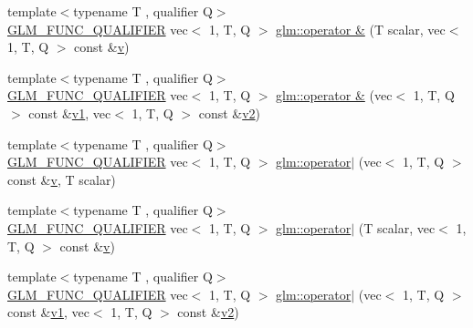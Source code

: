 \begin{DoxyCompactItemize}
\item 
{\footnotesize template$<$typename T , qualifier Q$>$ }\\\hyperlink{setup_8hpp_a33fdea6f91c5f834105f7415e2a64407}{G\+L\+M\+\_\+\+F\+U\+N\+C\+\_\+\+Q\+U\+A\+L\+I\+F\+I\+ER} vec$<$ 1, T, Q $>$ \hyperlink{group__ext__vec1_ga6637b42fbf149b977ce3f66571be212a}{glm\+::operator \&} (T scalar, vec$<$ 1, T, Q $>$ const \&\hyperlink{_s_d_l__opengl_8h_a10a82eabcb59d2fcd74acee063775f90}{v})
\item 
{\footnotesize template$<$typename T , qualifier Q$>$ }\\\hyperlink{setup_8hpp_a33fdea6f91c5f834105f7415e2a64407}{G\+L\+M\+\_\+\+F\+U\+N\+C\+\_\+\+Q\+U\+A\+L\+I\+F\+I\+ER} vec$<$ 1, T, Q $>$ \hyperlink{group__ext__vec1_ga9f942c4c4e896e42f1810824f7af294b}{glm\+::operator \&} (vec$<$ 1, T, Q $>$ const \&\hyperlink{_s_d_l__opengl__glext_8h_a435c176a02c061b43e19bdf7c86cceae}{v1}, vec$<$ 1, T, Q $>$ const \&\hyperlink{_s_d_l__opengl__glext_8h_a0928f6d0f0f794ba000a21dfae422136}{v2})
\item 
{\footnotesize template$<$typename T , qualifier Q$>$ }\\\hyperlink{setup_8hpp_a33fdea6f91c5f834105f7415e2a64407}{G\+L\+M\+\_\+\+F\+U\+N\+C\+\_\+\+Q\+U\+A\+L\+I\+F\+I\+ER} vec$<$ 1, T, Q $>$ \hyperlink{group__ext__vec1_ga4cb746ab6c11e1f5228e1468afcc0bfb}{glm\+::operator$\vert$} (vec$<$ 1, T, Q $>$ const \&\hyperlink{_s_d_l__opengl_8h_a10a82eabcb59d2fcd74acee063775f90}{v}, T scalar)
\item 
{\footnotesize template$<$typename T , qualifier Q$>$ }\\\hyperlink{setup_8hpp_a33fdea6f91c5f834105f7415e2a64407}{G\+L\+M\+\_\+\+F\+U\+N\+C\+\_\+\+Q\+U\+A\+L\+I\+F\+I\+ER} vec$<$ 1, T, Q $>$ \hyperlink{group__ext__vec1_gaee2907e10f2307c2e36147741400da29}{glm\+::operator$\vert$} (T scalar, vec$<$ 1, T, Q $>$ const \&\hyperlink{_s_d_l__opengl_8h_a10a82eabcb59d2fcd74acee063775f90}{v})
\item 
{\footnotesize template$<$typename T , qualifier Q$>$ }\\\hyperlink{setup_8hpp_a33fdea6f91c5f834105f7415e2a64407}{G\+L\+M\+\_\+\+F\+U\+N\+C\+\_\+\+Q\+U\+A\+L\+I\+F\+I\+ER} vec$<$ 1, T, Q $>$ \hyperlink{group__ext__vec1_ga837171e73bbc4fe6d067f275947f1b34}{glm\+::operator$\vert$} (vec$<$ 1, T, Q $>$ const \&\hyperlink{_s_d_l__opengl__glext_8h_a435c176a02c061b43e19bdf7c86cceae}{v1}, vec$<$ 1, T, Q $>$ const \&\hyperlink{_s_d_l__opengl__glext_8h_a0928f6d0f0f794ba000a21dfae422136}{v2})
\item 

\end{DoxyCompactItemize}

